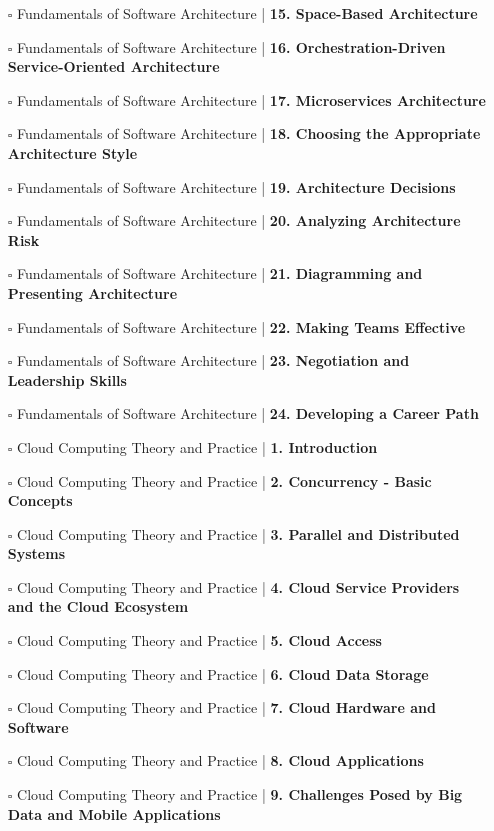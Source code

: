 \documentclass[a4, landscape, 12pt]{article}
\newcommand{\checkbox}{$\square$}%
\begin{document}
\begin{itemize}
{}
\item [\checkbox]  Fundamentals of Software Architecture  | \textbf{ 15. Space-Based Architecture
}
\item [\checkbox]  Fundamentals of Software Architecture  | \textbf{ 16. Orchestration-Driven Service-Oriented Architecture
}
\item [\checkbox]  Fundamentals of Software Architecture  | \textbf{ 17. Microservices Architecture
}
\item [\checkbox]  Fundamentals of Software Architecture  | \textbf{ 18. Choosing the Appropriate Architecture Style
}
\item [\checkbox]  Fundamentals of Software Architecture  | \textbf{ 19. Architecture Decisions
}
\item [\checkbox]  Fundamentals of Software Architecture  | \textbf{ 20. Analyzing Architecture Risk
}
\item [\checkbox]  Fundamentals of Software Architecture  | \textbf{ 21. Diagramming and Presenting Architecture
}
\item [\checkbox]  Fundamentals of Software Architecture  | \textbf{ 22. Making Teams Effective
}
\item [\checkbox]  Fundamentals of Software Architecture  | \textbf{ 23. Negotiation and Leadership Skills
}
\item [\checkbox]  Fundamentals of Software Architecture  | \textbf{ 24. Developing a Career Path
}
\item [\checkbox]  Cloud Computing Theory and Practice | \textbf{ 1. Introduction
}
\item [\checkbox]  Cloud Computing Theory and Practice | \textbf{ 2. Concurrency - Basic Concepts
}
\item [\checkbox]  Cloud Computing Theory and Practice | \textbf{ 3. Parallel and Distributed Systems
}
\item [\checkbox]  Cloud Computing Theory and Practice | \textbf{ 4. Cloud Service Providers and the Cloud Ecosystem
}
\item [\checkbox]  Cloud Computing Theory and Practice | \textbf{ 5. Cloud Access
}
\item [\checkbox]  Cloud Computing Theory and Practice | \textbf{ 6. Cloud Data Storage
}
\item [\checkbox]  Cloud Computing Theory and Practice | \textbf{ 7. Cloud Hardware and Software
}
\item [\checkbox]  Cloud Computing Theory and Practice | \textbf{ 8. Cloud Applications
}
\item [\checkbox]  Cloud Computing Theory and Practice | \textbf{ 9. Challenges Posed by Big Data and Mobile Applications
}
\end{itemize}
\end{document}

